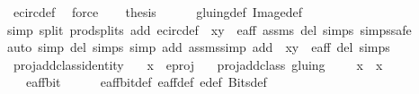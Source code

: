 \begin{isabellebody}
\ e{\isacharunderscore}circ{\isacharunderscore}def\ \isamarkupfalse%
\ force\isanewline
\ \ \isamarkupfalse%
\ {\isacharquery}thesis\isanewline
\ \ \ \ \isamarkupfalse%
\ gluing{\isacharunderscore}def\ Image{\isacharunderscore}def\isanewline
\ \ \ \ \isamarkupfalse%
{\isacharparenleft}simp\ split{\isacharcolon}\ prod{\isachardot}splits\ add{\isacharcolon}\ e{\isacharunderscore}circ{\isacharunderscore}def\ {\isacartoucheopen}{\isasymtau}\ {\isacharparenleft}x{\isacharcomma}y{\isacharparenright}\ {\isasymin}\ e{\isacharunderscore}aff{\isacartoucheclose}\ assms\ del{\isacharcolon}\ {\isasymtau}{\isachardot}simps\ {\isasymrho}{\isachardot}simps{\isacharcomma}safe{\isacharparenright}\isanewline
\ \ \ \ \isamarkupfalse%
{\isacharparenleft}auto\ simp\ del{\isacharcolon}\ {\isasymtau}{\isachardot}simps{\isacharcomma}\ simp\ add{\isacharcolon}\ assms{\isacharcomma}simp\ add{\isacharcolon}\ {\isacartoucheopen}{\isasymtau}\ {\isacharparenleft}x{\isacharcomma}y{\isacharparenright}\ {\isasymin}\ e{\isacharunderscore}aff{\isacartoucheclose}\ del{\isacharcolon}\ {\isasymtau}{\isachardot}simps{\isacharparenright}\isanewline
{}\isamarkupfalse%
%
\endisatagproof
{\isafoldproof}%
%
\isadelimproof
\isanewline
%
\endisadelimproof
\isanewline
{}\isamarkupfalse%
\ proj{\isacharunderscore}add{\isacharunderscore}class{\isacharunderscore}identity{\isacharcolon}\isanewline
\ \ \ {\isachardoublequoteopen}x\ {\isasymin}\ e{\isacharunderscore}proj{\isachardoublequoteclose}\isanewline
\ \ \ {\isachardoublequoteopen}proj{\isacharunderscore}add{\isacharunderscore}class\ {\isacharparenleft}gluing\ {\isacharbackquote}{\isacharbackquote}\ {\isacharbraceleft}{\isacharparenleft}{\isacharparenleft}{}{\isacharcomma}\ {}{\isacharparenright}{\isacharcomma}\ {}{\isacharparenright}{\isacharbraceright}{\isacharparenright}\ x\ {\isacharequal}\ {\isacharbraceleft}x{\isacharbraceright}{\isachardoublequoteclose}\isanewline
%
\isadelimproof
%
\endisadelimproof
%
\isatagproof
{}\isamarkupfalse%
\ {\isacharminus}\isanewline
\ \ \isamarkupfalse%
\ {\isachardoublequoteopen}{\isacharparenleft}{\isacharparenleft}{}{\isacharcomma}{}{\isacharparenright}{\isacharcomma}{}{\isacharparenright}\ {\isasymin}\ e{\isacharunderscore}aff{\isacharunderscore}bit{\isachardoublequoteclose}\isanewline
\ \ \ \ \isamarkupfalse%
\ e{\isacharunderscore}aff{\isacharunderscore}bit{\isacharunderscore}def\ e{\isacharunderscore}aff{\isacharunderscore}def\ e{\isacharprime}{\isacharunderscore}def\ Bits{\isacharunderscore}def\isanewline

\end{isabellebody}
